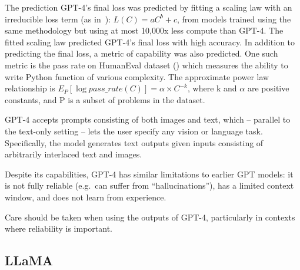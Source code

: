 The prediction GPT-4’s final loss was predicted by fitting a scaling law with an irreducible loss term (as in~\textcite{henighan2020scaling}): \(L(C) = aC^b + c\), from models trained using the same methodology but using at most 10,000x less compute than GPT-4.
The fitted scaling law predicted GPT-4’s final loss with high accuracy.
In addition to predicting the final loss, a metric of capability was also predicted.
One such metric is the pass rate on HumanEval dataset (\textcite{chen2021evaluating}) which measures the ability to write Python function of various complexity.
The approximate power law relationship is \(E_P [\log{pass\_rate(C)}] = \alpha \times C^{-k}\), where k and \(\alpha\) are positive constants, and P is a subset of problems in the dataset.

GPT-4 accepts prompts consisting of both images and text, which -- parallel to the text-only setting -- lets the user specify any vision or language task.
Specifically, the model generates text outputs given inputs consisting of arbitrarily interlaced text and images.

Despite its capabilities, GPT-4 has similar limitations to earlier GPT models: it is not fully reliable (e.g.\ can suffer from \enquote{hallucinations}), has a limited context window, and does not learn from experience.

Care should be taken when using the outputs of GPT-4, particularly in contexts where reliability is important.

\subsection{LLaMA}
\label{subsec:llama}

